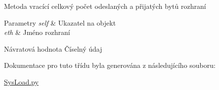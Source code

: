 Metoda vracící celkový počet odeslaných a přijatých bytů rozhraní 


\begin{DoxyParams}{Parametry}
{\em self} & Ukazatel na objekt \\
\hline
{\em eth} & Jméno rozhraní \\
\hline
\end{DoxyParams}
\begin{DoxyReturn}{Návratová hodnota}
Číselný údaj 
\end{DoxyReturn}


Dokumentace pro tuto třídu byla generována z následujícího souboru\-:\begin{DoxyCompactItemize}
\item 
\hyperlink{SysLoad_8py}{Sys\-Load.\-py}\end{DoxyCompactItemize}
